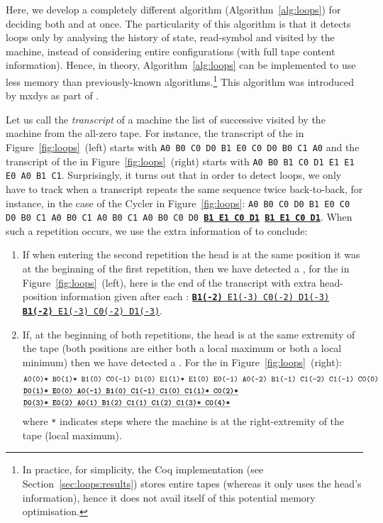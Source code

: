 Here, we develop a completely different algorithm (Algorithm~\ref{alg:loops}) for deciding both \cyclers and \TCs at once. The particularity of this algorithm is that it detects loops only by analysing the history of state, read-symbol and \headposs visited by the machine, instead of considering entire configurations (\ie with full tape content information). Hence, in theory, Algorithm~\ref{alg:loops} can be implemented to use less memory than previously-known algorithms.\footnote{In practice, for simplicity, the Coq implementation (see Section~\ref{sec:loops:results}) stores entire tapes (whereas it only uses the head's information), hence it does not avail itself of this potential memory optimisation.} This algorithm was introduced by mxdys as part of \CoqBB.

Let us call the \textit{transcript} of a machine the list of successive \ssps visited by the machine from the all-zero tape. For instance, the transcript of the \cycler in Figure~\ref{fig:loops}~(left) starts with \texttt{A0 B0 C0 D0 B1 E0 C0 D0 B0 C1 A0} and the transcript of the \TC in Figure~\ref{fig:loops}~(right) starts with \texttt{A0 B0 B1 C0 D1 E1 E1 E0 A0 B1 C1}. Surprisingly, it turns out that in order to detect loops, we only have to track when a transcript repeats the same sequence twice back-to-back, for instance, in the case of the Cycler in Figure~\ref{fig:loops}: \texttt{A0 B0 C0 D0 B1 E0 C0 D0 B0 C1 A0 B0 C1 A0 B0 C1 A0 B0 C0 D0 \textbf{\underline{B1 E1 C0 D1}} \textbf{\underline{B1 E1 C0 D1}}}. When such a repetition occurs, we use the extra information of \headpos to conclude:

\begin{enumerate}
    \item If when entering the second repetition the head is at the same position it was at the beginning of the first repetition, then we have detected a \cycler, \eg for the \cycler in Figure~\ref{fig:loops}~(left), here is the end of the transcript with extra head-position information given after each \ssp: \texttt{\underline{\textbf{B1(-2)} E1(-3) C0(-2) D1(-3)} \underline{\textbf{B1(-2)} E1(-3) C0(-2) D1(-3)}}.

    \item If, at the beginning of both repetitions, the head is at the same extremity of the tape (\ie both positions are either both a local maximum or both a local minimum) then we have detected a \TC. For the \TC in Figure~\ref{fig:loops}~(right):
          \begin{align*}
               & \texttt{A0(0)* B0(1)* B1(0) C0(-1) D1(0) E1(1)* E1(0) E0(-1) A0(-2) B1(-1) C1(-2) C1(-1) C0(0)} \\
               & \texttt{\underline{\textbf{D0(1)* E0(0) A0(-1) B1(0) C1(-1) C1(0) C1(1)* C0(2)*}}}              \\
               & \texttt{\underline{\textbf{D0(3)* E0(2) A0(1) B1(2) C1(1) C1(2) C1(3)* C0(4)*}}}
          \end{align*}
          \noindent where \texttt{*} indicates steps where the machine is at the right-extremity of the tape (\headpos local maximum).


\end{enumerate}

